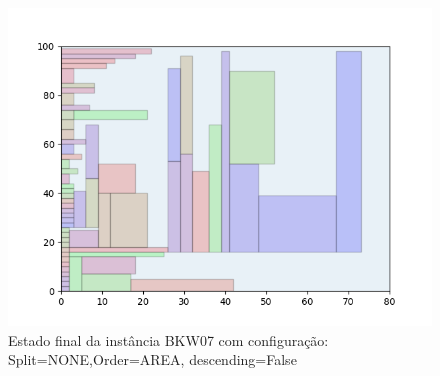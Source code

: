 \begin{figure}[H]
    \centering
    \caption[]{Estado final da instância BKW07 com configuração: Split=NONE,Order=AREA, descending=False}
    \label{fig:bkw07-none-area-false}
    \includegraphics[scale=0.5]{output/figures/bkw/bkw07/none/area/false/00}
\end{figure}